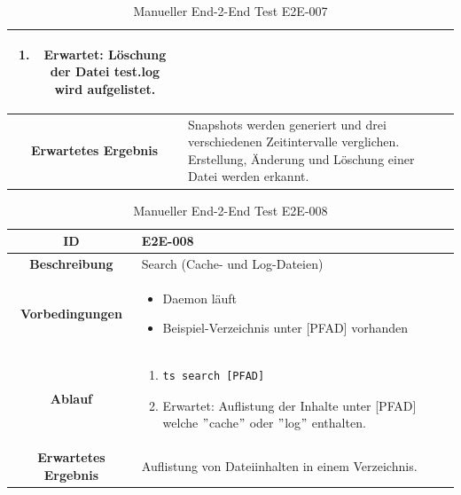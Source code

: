 \documentclass[a4paper,12pt]{report}
\begin{document}
\begin{table}[h!]
\begin{tabular}{|c|p{10cm}|}
\begin{enumerate}
                \item Erwartet: Löschung der Datei test.log wird aufgelistet.
            \end{enumerate} \\ \hline
            \textbf{Erwartetes Ergebnis} & Snapshots werden generiert und drei verschiedenen Zeitintervalle verglichen.
            Erstellung, Änderung und Löschung einer Datei werden erkannt. \\ \hline
        \end{tabular}
        \caption{Manueller End-2-End Test E2E-007}\label{tab:e2e-7}
    \end{table}

    \clearpage

    \begin{table}[h!]
        \centering
        \setlength{\leftmargini}{0.8cm}
        \begin{tabular}{|c|p{10cm}|}
            \hline
            \textbf{ID}                  & E2E-008                                            \\ \hline
            \textbf{Beschreibung}        & Search (Cache- und Log-Dateien)                    \\ \hline
            \textbf{Vorbedingungen} &
            \begin{itemize}
                \item Daemon läuft
                \item Beispiel-Verzeichnis unter [PFAD] vorhanden
            \end{itemize} \\ \hline
            \textbf{Ablauf} &
            \begin{enumerate}
                \item \begin{verbatim}ts search [PFAD]
                \end{verbatim}
                \item Erwartet: Auflistung der Inhalte unter [PFAD] welche \("\)cache\("\) oder \("\)log\("\) enthalten.
            \end{enumerate} \\ \hline
            \textbf{Erwartetes Ergebnis} & Auflistung von Dateiinhalten in einem Verzeichnis. \\ \hline
        \end{tabular}
        \caption{Manueller End-2-End Test E2E-008}\label{tab:e2e-8}
    \end{table}
\end{document}
